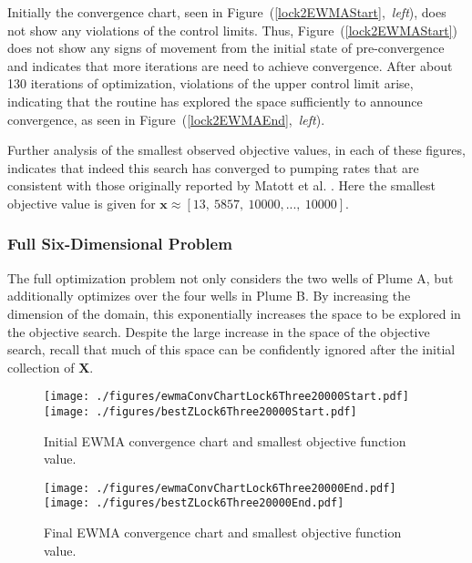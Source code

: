 \documentclass[12pt]{article}
\begin{document}
	Initially the convergence chart, seen in \mbox{Figure (\ref{lock2EWMAStart}, {\it left}),} does not show any violations of the control limits.
	Thus, \mbox{Figure (\ref{lock2EWMAStart})} does not show any signs of movement from the initial state of pre-convergence and indicates that more iterations are need to achieve convergence. 
	After about 130 iterations of optimization, violations of the upper control limit arise, indicating that the routine has explored the space \mbox{sufficiently} to announce convergence, as seen in \mbox{Figure (\ref{lock2EWMAEnd}, {\it left}).}
	
	
	Further analysis of the smallest observed objective values, in each of these figures, indicates that indeed this search has converged to pumping rates that are consistent with those originally reported by Matott et al. \cite{lockCite}. 
	Here the smallest objective value is given for \mbox{$\bm{x} \approx \left[13,~5857,~10000,...,~10000\right]$.}    
	
	\clearpage
	\subsubsection{Full Six-Dimensional Problem}
	
	The full optimization problem not only considers the two wells of Plume A, but additionally optimizes over the four wells in Plume B.
	By increasing the dimension of the domain, this exponentially increases the space to be explored in the objective search.
	Despite the large increase in the space of the objective search, recall that much of this space can be confidently ignored after the initial collection of $\bm{X}$.

	\begin{wrapfigure}{l}{0.5\textwidth}
	\texttt{[image: ./figures/ewmaConvChartLock6Three20000Start.pdf]}
	\texttt{[image: ./figures/bestZLock6Three20000Start.pdf]}
	\caption{Initial EWMA convergence chart and smallest objective function value. }
	\label{lock6EWMAStart}
	$~$\\
	\texttt{[image: ./figures/ewmaConvChartLock6Three20000End.pdf]}
	\texttt{[image: ./figures/bestZLock6Three20000End.pdf]}
	\caption{Final EWMA convergence chart and smallest objective function value. }
	\label{lock6EWMAEnd}
	\end{wrapfigure}
	
\end{document}
